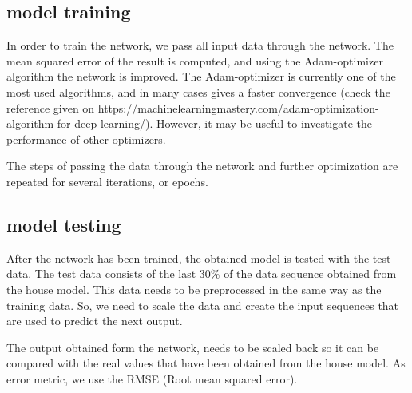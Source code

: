 \subsection{model training}
In order to train the network, we pass all input data through the network. The mean squared error of the result is computed, and using the Adam-optimizer algorithm the network is improved. The Adam-optimizer is currently one of the most used algorithms, and in many cases gives a faster convergence (check the reference given on https://machinelearningmastery.com/adam-optimization-algorithm-for-deep-learning/). However, it may be useful to investigate the performance of other optimizers.
 
The steps of passing the data through the network and further optimization are repeated for several iterations, or epochs.
 
%
%


\subsection{model testing}
After the network has been trained, the obtained model is tested with the test data. The test data consists of the last 30\% of the data sequence obtained from the house model. This data needs to be preprocessed in the same way as the training data. So, we need to scale the data and create the input sequences that are used to predict the next output. 

The output obtained form the network, needs to be scaled back so it can be compared with the real values that have been obtained from the house model. As error metric, we use the RMSE (Root mean squared error). 

